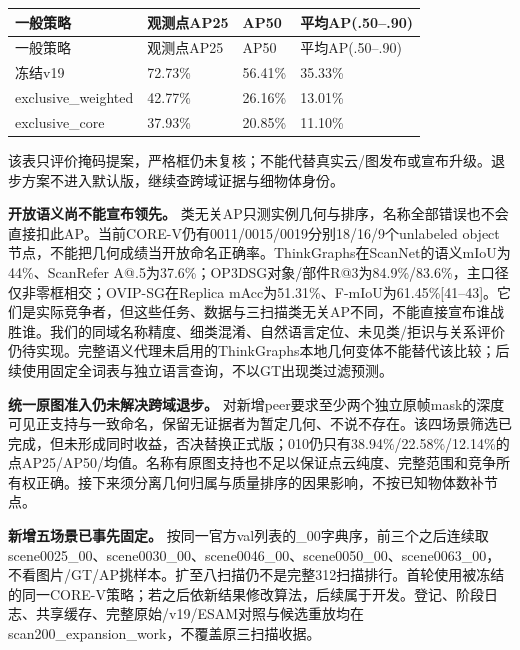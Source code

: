 \documentclass[UTF8,fontset=fandol]{ctexart}
\begin{document}
{\small
\begin{longtable}{|p{}|p{}|p{}|p{}|}
\hline
一般策略 & 观测点AP25 & AP50 & 平均AP(.50–.90) \\ \hline
\endfirsthead
\hline
一般策略 & 观测点AP25 & AP50 & 平均AP(.50–.90) \\ \hline
\endhead
冻结v19 & 72.73\% & 56.41\% & 35.33\% \\ \hline
exclusive\_weighted & 42.77\% & 26.16\% & 13.01\% \\ \hline
exclusive\_core & 37.93\% & 20.85\% & 11.10\% \\ \hline
\end{longtable}
}

该表只评价掩码提案，严格框仍未复核；不能代替真实云/图发布或宣布升级。退步方案不进入默认版，继续查跨域证据与细物体身份。



\textbf{开放语义尚不能宣布领先。} 类无关AP只测实例几何与排序，名称全部错误也不会直接扣此AP。当前CORE-V仍有0011/0015/0019分别18/16/9个unlabeled object节点，不能把几何成绩当开放命名正确率。ThinkGraphs在ScanNet的语义mIoU为44\%、ScanRefer A@.5为37.6\%；OP3DSG对象/部件R@3为84.9\%/83.6\%，主口径仅非零框相交；OVIP-SG在Replica mAcc为51.31\%、F-mIoU为61.45\%[41–43]。它们是实际竞争者，但这些任务、数据与三扫描类无关AP不同，不能直接宣布谁战胜谁。我们的同域名称精度、细类混淆、自然语言定位、未见类/拒识与关系评价仍待实现。完整语义代理未启用的ThinkGraphs本地几何变体不能替代该比较；后续使用固定全词表与独立语言查询，不以GT出现类过滤预测。



\textbf{统一原图准入仍未解决跨域退步。} 对新增peer要求至少两个独立原帧mask的深度可见正支持与一致命名，保留无证据者为暂定几何、不说不存在。该四场景筛选已完成，但未形成同时收益，否决替换正式版；010仍只有38.94\%/22.58\%/12.14\%的点AP25/AP50/均值。名称有原图支持也不足以保证点云纯度、完整范围和竞争所有权正确。接下来须分离几何归属与质量排序的因果影响，不按已知物体数补节点。



\textbf{新增五场景已事先固定。} 按同一官方val列表的\_00字典序，前三个之后连续取scene0025\_00、scene0030\_00、scene0046\_00、scene0050\_00、scene0063\_00，不看图片/GT/AP挑样本。扩至八扫描仍不是完整312扫描排行。首轮使用被冻结的同一CORE-V策略；若之后依新结果修改算法，后续属于开发。登记、阶段日志、共享缓存、完整原始/v19/ESAM对照与候选重放均在scan200\_expansion\_work，不覆盖原三扫描收据。
\end{document}
